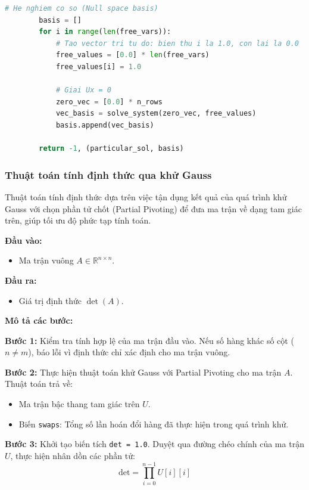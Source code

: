 \documentclass[a4paper]{article}
\begin{document}
\begin{lstlisting}[language=Python, caption={Hàm giải hệ tam giác trên Ux = c - $back_substitution.py$}]
        # He nghiem co so (Null space basis)
        basis = []
        for i in range(len(free_vars)):
            # Tao vector tri tu do: bien thu i la 1.0, con lai la 0.0
            free_values = [0.0] * len(free_vars)
            free_values[i] = 1.0

            # Giai Ux = 0 
            zero_vec = [0.0] * n_rows
            vec_basis = solve_system(zero_vec, free_values)
            basis.append(vec_basis)
        
        return -1, (particular_sol, basis)
\end{lstlisting}

\subsubsection{Thuật toán tính định thức qua khử Gauss}

Thuật toán tính định thức dựa trên việc tận dụng kết quả của quá trình khử Gauss với chọn phần tử chốt (Partial Pivoting) để đưa ma trận về dạng tam giác trên, giúp tối ưu độ phức tạp tính toán.

\textbf{Đầu vào: }

\begin{itemize}
    \item Ma trận vuông $A \in \mathbb{R}^{n \times n}$.
\end{itemize}

\textbf{Đầu ra: }

\begin{itemize}
    \item Giá trị định thức $\det(A)$.
\end{itemize}

\textbf{Mô tả các bước: }

\textbf{Bước 1: } Kiểm tra tính hợp lệ của ma trận đầu vào. Nếu số hàng khác số cột ($n \neq m$), báo lỗi vì định thức chỉ xác định cho ma trận vuông.

\textbf{Bước 2: } Thực hiện thuật toán khử Gauss với Partial Pivoting cho ma trận $A$. Thuật toán trả về:
\begin{itemize}
    \item Ma trận bậc thang tam giác trên $U$.
    \item Biến \texttt{swaps}: Tổng số lần hoán đổi hàng đã thực hiện trong quá trình khử.
\end{itemize}

\textbf{Bước 3: } Khởi tạo biến tích \texttt{det = 1.0}. Duyệt qua đường chéo chính của ma trận $U$, thực hiện nhân dồn các phần tử:
\begin{equation}
    \text{det} = \prod_{i=0}^{n-1} U[i][i]
\end{equation}
\end{document}
